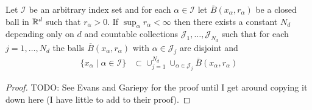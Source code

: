 \begin{thm}\label{BesicovichCoveringTheorem}
Let $\mathcal{I}$ be an arbitrary index set and for each $\alpha \in \mathcal{I}$ let $\overline{B}(x_\alpha, r_\alpha)$ be a closed
ball in $\mathbb{R}^d$ such that $r_\alpha > 0$.  If $\sup_{\alpha} r_\alpha < \infty$ then there exists a
constant $N_d$ depending only on $d$ and countable collections $\mathcal{J}_1, \dotsc, \mathcal{J}_{N_d}$ such
that for each $j=1, \dotsc, N_d$ the balls $\overline{B}(x_\alpha, r_\alpha)$ with $\alpha \in \mathcal{J}_j$ are disjoint and
\begin{align*}
\lbrace x_\alpha \mid \alpha \in \mathcal{I} \rbrace &\subset \cup_{j=1}^{N_d} \cup_{\alpha \in \mathcal{J}_j} \overline{B}(x_\alpha, r_\alpha)
\end{align*}
\end{thm}
\begin{proof}
TODO:
See Evans and Gariepy for the proof until I get around copying it down here (I have little to add to their proof).
\end{proof}

